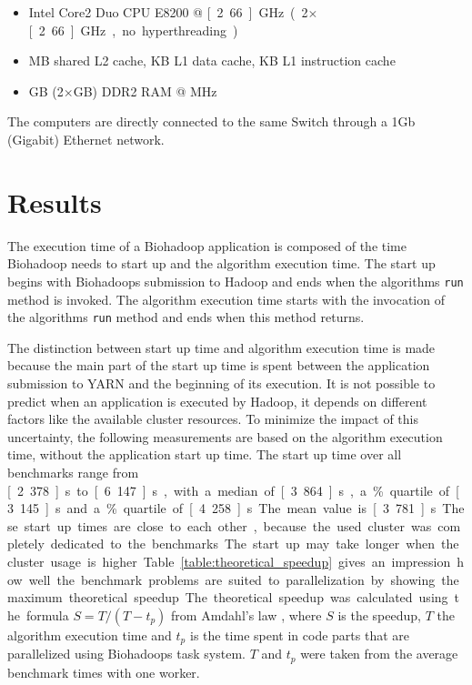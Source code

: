 \begin{itemize}
  \item Intel Core2 Duo CPU E8200 @ \unit[2.66]{GHz} (2$\times$\unit[2.66]{GHz}, no hyperthreading)
  \item \unit[6]{MB} shared L2 cache, \unit[32]{KB} L1 data cache, \unit[32]{KB} L1 instruction cache
  \item \unit[4]{GB} (2$\times$\unit[2]{GB}) DDR2 RAM @ \unit[667]{MHz}
\end{itemize}

The computers are directly connected to the same Switch through a 1Gb (Gigabit) Ethernet network.

\section{Results}
\label{chap:evaluation:result}
The execution time of a Biohadoop application is composed of the time Biohadoop needs to start up and the algorithm execution time. The start up begins with Biohadoops submission to Hadoop and ends when the algorithms \texttt{run} method is invoked. The algorithm execution time starts with the invocation of the algorithms \texttt{run} method and ends when this method returns.

The distinction between start up time and algorithm execution time is made because the main part of the start up time is spent between the application submission to YARN and the beginning of its execution. It is not possible to predict when an application is executed by Hadoop, it depends on different factors like the available cluster resources. To minimize the impact of this uncertainty, the following measurements are based on the algorithm execution time, without the application start up time. The start up time over all benchmarks range from \unit[2.378]{s} to \unit[6.147]{s}, with a median of \unit[3.864]{s}, a \unit[25]{\%} quartile of \unit[3.145]{s} and a \unit[75]{\%} quartile of \unit[4.258]{s}. The mean value is \unit[3.781]{s}. These start up times are close to each other, because the used cluster was completely dedicated to the benchmarks. The start up may take longer when the cluster usage is higher.

Table \ref{table:theoretical_speedup} gives an impression how well the benchmark problems are suited to parallelization by showing the maximum theoretical speedup. The theoretical speedup was calculated using the formula $S = T / (T - t_p)$ from Amdahl's law \cite{amdahl1967validity}, where $S$ is the speedup, $T$ the algorithm execution time and $t_p$ is the time spent in code parts that are parallelized using Biohadoops task system. $T$ and $t_p$ were taken from the average benchmark times with one worker.

